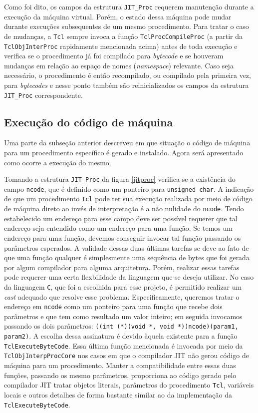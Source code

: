 Como foi dito, os campos da estrutura \verb!JIT_Proc! requerem
manutenção durante a execução da máquina virtual. Porém, o estado dessa
máquina pode mudar durante execuções subsequentes de um mesmo
procedimento. Para tratar o caso de mudanças, a \texttt{Tcl} sempre invoca a
função \verb!TclProcCompileProc! (a partir da \verb!TclObjInterProc!
rapidamente mencionada acima) antes de toda execução e verifica se o
procedimento já foi compilado para \textit{bytecode} e se houveram
mudanças em relação ao espaço de nomes (\textit{namespace})
relevante. Caso seja necessário, o procedimento é então recompilado,
ou compilado pela primeira vez, para \textit{bytecodes} e nesse ponto
também são reinicializados os campos da estrutura \verb!JIT_Proc!
correspondente.


\subsection{Execução do código de máquina}
\label{codeexec}
Uma parte da subseção anterior descreveu em que situação o código de
máquina para um procedimento específico é gerado e instalado. Agora será
apresentado como ocorre a execução do mesmo.

Tomando a estrutura \verb!JIT_Proc! da figura \ref{jitproc}
verifica-se a existência do campo \verb!ncode!, que é definido como
um ponteiro para \verb!unsigned char!. A indicação de que um
procedimento \texttt{Tcl} pode ter sua execução realizada por meio de
código de máquina direto ao invés de interpretação é a não nulidade do
\verb!ncode!. Tendo estabelecido um endereço para esse campo deve ser
possível requerer que tal endereço seja entendido como um endereço para
uma função. Se temos um endereço para uma função, devemos conseguir
invocar tal função passando os parâmetros esperados. A validade dessas
duas últimas tarefas se deve ao fato de que uma função qualquer é
simplesmente uma sequência de bytes que foi gerada por algum
compilador para alguma arquitetura. Porém, realizar essas tarefas pode
requerer uma certa flexbilidade da linguagem que se deseja
utilizar. No caso da linguagem \texttt{C}, que foi a escolhida para
esse projeto, é permitido realizar um \textit{cast} adequado que
resolve esse problema. Especificamente, queremos tratar o endereço em
\verb!ncode! como um ponteiro para uma função que recebe dois
parâmetros e que tem como resultado um valor inteiro;
em seguida invocamos passando os dois parâmetros:
\verb!((int (*)(void *, void *))ncode)(param1, param2)!. A escolha
dessa assinatura é devido àquela existente para a função
\verb!TclExecuteByteCode!. Essa última função mencionada é invocada
por meio da \verb!TclObjInterpProcCore! nos casos em que o compilador
JIT não gerou código de máquina para um procedimento. Manter a
compatibilidade entre essas duas funções, passando os mesmo
parâmetros, proporciona ao código gerado pelo compilador JIT tratar
objetos literais, parâmetros do procedimento \texttt{Tcl}, variáveis
locais e outros detalhes de forma bastante similar ao da
implementação da \verb!TclExecuteByteCode!.


